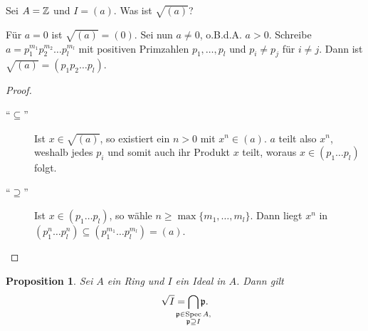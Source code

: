 \documentclass[12pt,a4paper]{scrartcl}
\theoremstyle{cplain}
\newtheorem{prop}[thmcounter]{Proposition}
\theoremstyle{cdef}
\begin{document}
\begin{bsp}
    Sei $A=\mathbb Z$ und $I=(a)$. Was ist $\sqrt{(a)}$?

    Für $a=0$ ist $\sqrt{(a)}=(0)$. Sei nun $a\neq 0$, o.B.d.A. $a>0$. Schreibe $a=p_1^{m_1}p_2^{m_2}\ldots p_l^{m_l}$ mit positiven Primzahlen $p_1, \ldots, p_l$ und $p_i\neq p_j$ für $i\neq j$. Dann ist $\sqrt{(a)}=(p_1p_2\ldots p_l)$.

    \begin{proof}
        \leavevmode
        \begin{description}
            \item[\enquote{$\subseteq$}] Ist $x\in \sqrt{(a)}$, so existiert ein $n>0$ mit $x^n \in (a)$. $a$ teilt also $x^n$, weshalb jedes $p_i$ und somit auch ihr Produkt $x$ teilt, woraus $x \in (p_1\ldots p_l)$ folgt.
            \item[\enquote{$\supseteq$}] Ist $x \in (p_1\ldots p_l)$, so wähle $n \ge \max\{m_1,\ldots,m_l\}$. Dann liegt $x^n$ in $(p_1^n\ldots p_l^n) \subseteq (p_1^{m_1}\ldots p_l^{m_l}) = (a)$.
            \qedhere
        \end{description}
    \end{proof}
\end{bsp}
\begin{prop}
    Sei $A$ ein Ring und $I$ ein Ideal in $A$. Dann gilt
    \[\sqrt{I} = \bigcap_{\mathclap{\substack{\fp\in \Spec A,\\ \fp\supseteq I}}} \fp.\]
\end{prop}
\end{document}
